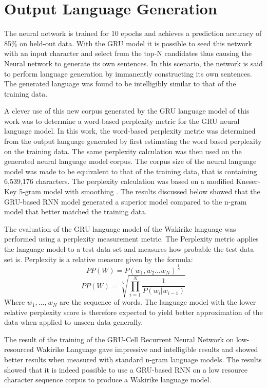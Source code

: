 \section{Output Language Generation}
The neural network is trained for 10 epochs and achieves a prediction accuracy of 85\% on held-out data.  With the GRU model it is possible to seed this network with an input character and select from the top-N candidates thus causing the Neural network to generate its own sentences.  In this scenario, the network is said to perform language generation by immanently constructing its own sentences.  The generated language was found to be intelligibly similar to that of the training data. 

A clever use of this new corpus generated by the GRU language model of this work was to determine a word-based perplexity metric for the GRU neural language model. In this work, the word-based perplexity metric was determined from the output language generated by first estimating the word based perplexity on the training data.  The same perplexity calculation was then used on the generated neural language model corpus. The corpus size of the neural language model was made to be equivalent to that of the training data, that is containing 6,539,176 characters.  The perplexity calculation was based on a modified Kneser-Key 5-gram model with smoothing \citep{Heafield-estimate}.  The results discussed below showed that the GRU-based RNN model generated a superior model compared to the n-gram model that better matched the training data.

The evaluation of the GRU language model of the Wakirike language was performed using a perplexity measurement metric. The Perplexity metric applies the language model to a test data-set and measures how probable the test data-set is. Perplexity is a relative measure given by the formula:
%
\begin{equation}
PP(W)=P(w_1,w_2\dots w_N)^\frac{1}{N}
\label{ch5_eq1_ppx}
\end{equation}
%
%
\begin{equation}
PP(W)=\sqrt[N]{\prod_{i=1}^N\frac{1}{P(w_i|w_{i-1})}}
\label{ch5_eq2_ppx}
\end{equation}
%
Where $w_1,\dots,w_N$ are the sequence of words. The language model with the lower relative perplexity score is therefore expected to yield better approximation of the data when applied to unseen data generally.

The result of the training of the GRU-Cell Recurrent Neural Network on low-resourced Wakirike Language gave impressive and intelligible results and showed better results when measured with standard n-gram language models. The results showed that it is indeed possible to use a GRU-based RNN on a low resource character sequence corpus to produce a Wakirike language model.

